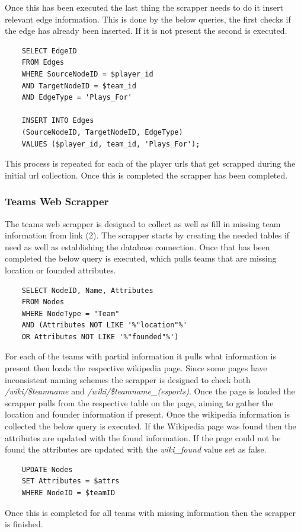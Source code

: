 \documentclass[sigconf]{acmart}
\begin{document}
Once this has been executed the last thing the scrapper needs to do it insert relevant edge information. This is done by the below queries, the first checks if the edge has already been inserted. If it is not present the second is executed.
\begin{verbatim}
    SELECT EdgeID
    FROM Edges
    WHERE SourceNodeID = $player_id
    AND TargetNodeID = $team_id
    AND EdgeType = 'Plays_For'

    INSERT INTO Edges
    (SourceNodeID, TargetNodeID, EdgeType)
    VALUES ($player_id, team_id, 'Plays_For');
\end{verbatim}
This process is repeated for each of the player urls that get scrapped during the initial url collection. Once this is completed the scrapper has been completed.
\subsubsection{Teams Web Scrapper}
The teams web scrapper is designed to collect as well as fill in missing team information from link (2). The scrapper starts by creating the needed tables if need as well as establishing the database connection. Once that has been completed the below query is executed, which pulls teams that are missing location or founded attributes.
\begin{verbatim}
    SELECT NodeID, Name, Attributes 
    FROM Nodes 
    WHERE NodeType = "Team" 
    AND (Attributes NOT LIKE '%"location"%' 
    OR Attributes NOT LIKE '%"founded"%')
\end{verbatim}
For each of the teams with partial information it pulls what information is present then loads the respective wikipedia page. Since some pages have inconsistent naming schemes the scrapper is designed to check both \textit{/wiki/\$teamname} and \textit{/wiki/\$teamname\_(esports)}. Once the page is loaded the scrapper pulls from the respective table on the page, aiming to gather the location and founder information if present. Once the wikipedia information is collected the below query is executed. If the Wikipedia page was found then the attributes are updated with the found information. If the page could not be found the attributes are updated with the \textit{wiki\_found} value set as false.
\begin{verbatim}
    UPDATE Nodes 
    SET Attributes = $attrs 
    WHERE NodeID = $teamID
\end{verbatim}
Once this is completed for all teams with missing information then the scrapper is finished.
\end{document}
